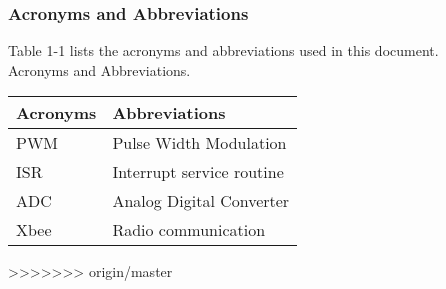 \documentclass[MTRX3700report.tex]{subfiles}
\begin{document}
\subsubsection{ Acronyms and Abbreviations}
Table   1-1 lists the acronyms and abbreviations used in this document.\\
Acronyms and Abbreviations.
\begin{center}
	\begin{tabular}{| l | l | }
	\hline
	Acronyms & Abbreviations		\\ \hline
	PWM	& Pulse Width Modulation	\\ \hline	
	ISR    & Interrupt service routine \\ \hline
	ADC  & Analog Digital Converter   \\ \hline
	Xbee & Radio communication	\\ 
	\hline
	\end{tabular}
\end{center}
	


		
	


>>>>>>> origin/master
\end{document}
